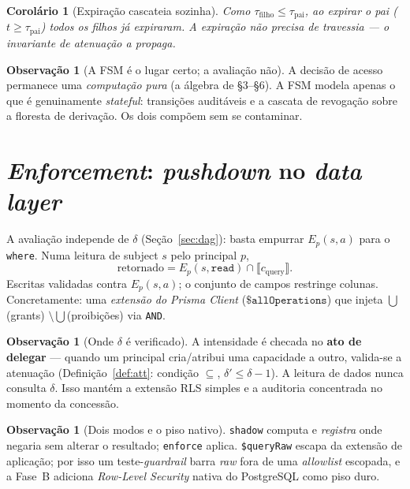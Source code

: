 \documentclass[11pt,a4paper]{article}
\newtheorem{corollary}[theorem]{Corolário}
\theoremstyle{definition}
\newtheorem{remark}[theorem]{Observação}
\newcommand{\ext}[1]{\llbracket #1 \rrbracket}
\newcommand{\dep}{\delta}
\begin{document}
  \begin{corollary}[Expiração cascateia sozinha]
  Como $\tau_{\text{filho}}\le\tau_{\text{pai}}$, ao expirar o pai
  ($t\ge\tau_{\text{pai}}$) todos os filhos já expiraram. A expiração não
  precisa de travessia --- o invariante de atenuação a propaga.
  \end{corollary}

  \begin{remark}[A FSM é o lugar certo; a avaliação não]
  A decisão de acesso permanece uma \emph{computação pura} (a álgebra de §3--§6).
  A FSM modela apenas o que é genuinamente \emph{stateful}: transições
  auditáveis e a cascata de revogação sobre a floresta de derivação. Os dois compõem sem se
  contaminar.
  \end{remark}

  \section{\emph{Enforcement}: \emph{pushdown} no \emph{data layer}}\label{sec:enf}

  A avaliação independe de $\dep$ (Seção~\ref{sec:dag}): basta empurrar
  $E_p(s,a)$ para o \texttt{where}. Numa leitura de subject $s$ pelo principal
  $p$,
  \[
    \text{retornado}=E_p(s,\texttt{read})\cap\ext{c_{\text{query}}} .
  \]
  Escritas validadas contra $E_p(s,a)$; o conjunto de campos restringe colunas.
  Concretamente: uma \emph{extensão do Prisma Client} ($\texttt{\$allOperations}$)
  que injeta $\bigcup$(grants) $\setminus\bigcup$(proibições) via \texttt{AND}.

  \begin{remark}[Onde $\dep$ é verificado]
  A intensidade é checada no \textbf{ato de delegar} --- quando um principal
  cria/atribui uma capacidade a outro, valida-se a atenuação
  (Definição~\ref{def:att}: condição $\subseteq$, $\dep'\le\dep-1$). A leitura
  de dados nunca consulta $\dep$. Isso mantém a extensão RLS simples e a
  auditoria concentrada no momento da concessão.
  \end{remark}

  \begin{remark}[Dois modos e o piso nativo]
  \texttt{shadow} computa e \emph{registra} onde negaria sem alterar o
  resultado; \texttt{enforce} aplica. \texttt{\$queryRaw} escapa da extensão de
  aplicação; por isso um teste-\emph{guardrail} barra \emph{raw} fora de uma
  \emph{allowlist} escopada, e a Fase~B adiciona \emph{Row-Level Security}
  nativa do PostgreSQL como piso duro.
  \end{remark}
\end{document}
